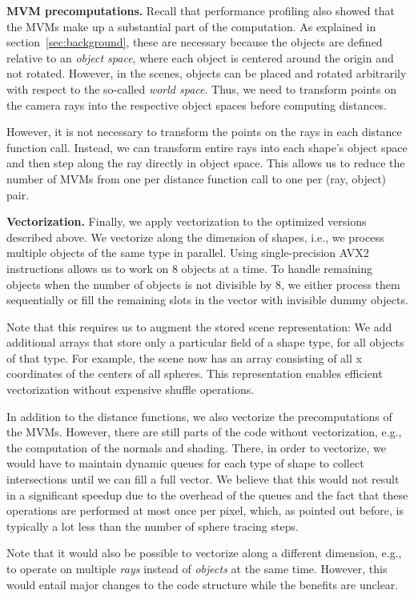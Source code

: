 \documentclass[letterpaper]{article}
\newcommand{\mypar}[1]{{\bf #1.}}
\begin{document}
\mypar{MVM precomputations}
Recall that performance profiling also showed that the MVMs make up a substantial part of the computation. As explained in section~\ref{sec:background}, these are necessary because the objects are defined relative to an \emph{object space}, where each object is centered around the origin and not rotated. However, in the scenes, objects can be placed and rotated arbitrarily with respect to the so-called \emph{world space}. Thus, we need to transform points on the camera rays into the respective object spaces before computing distances.

However, it is not necessary to transform the points on the rays in each distance function call. Instead, we can transform entire rays into each shape's object space and then step along the ray directly in object space. This allows us to reduce the number of MVMs from one per distance function call to one per (ray, object) pair.

\mypar{Vectorization}
Finally, we apply vectorization to the optimized versions described above. We vectorize along the dimension of shapes, i.e., we process multiple objects of the same type in parallel. Using single-precision AVX2 instructions allows us to work on 8 objects at a time.
To handle remaining objects when the number of objects is not divisible by 8, we either process them sequentially or fill the remaining slots in the vector with invisible dummy objects.

Note that this requires us to augment the stored scene representation: We add additional arrays that store only a particular field of a shape type, for all objects of that type. For example, the scene now has an array consisting of all x coordinates of the centers of all spheres. This representation enables efficient vectorization without expensive shuffle operations.

In addition to the distance functions, we also vectorize the precomputations of the MVMs. However, there are still parts of the code without vectorization, e.g., the computation of the normals and shading. There, in order to vectorize, we would have to maintain dynamic queues for each type of shape to collect intersections until we can fill a full vector.
We believe that this would not result in a significant speedup due to the overhead of the queues and the fact that these operations are performed at most once per pixel, which, as pointed out before, is typically a lot less than the number of sphere tracing steps.

Note that it would also be possible to vectorize along a different dimension, e.g., to operate on multiple \emph{rays} instead of \emph{objects} at the same time. However, this would entail major changes to the code structure while the benefits are unclear.
\end{document}
